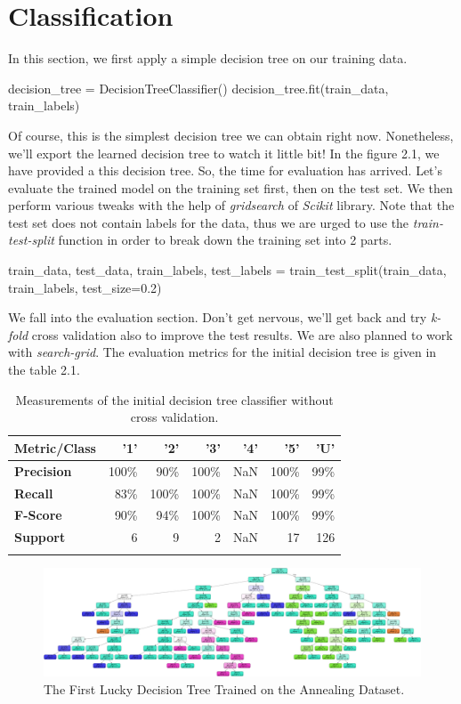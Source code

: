 \documentclass[12pt]{article}
\numberwithin{equation}{section}
\numberwithin{table}{section}
\numberwithin{figure}{section}
\begin{document}
\section{Classification}
In this section, we first apply a simple decision tree on our training data.
\begin{python}
	decision_tree = DecisionTreeClassifier()
	decision_tree.fit(train_data, train_labels)
\end{python}
Of course, this is the simplest decision tree we can obtain right now. Nonetheless, we'll export the learned decision tree to watch it little bit! In the figure 2.1, we have provided a this decision tree. So, the time for evaluation has arrived. Let's evaluate the trained model on the training set first, then on the test set. We then perform various tweaks with the help of \textit{gridsearch} of \textit{Scikit} library. Note that the test set does not contain labels for the data, thus we are urged to use the \textit{train-test-split} function in order to break down the training set into 2 parts.
\begin{python}
	train_data, test_data, train_labels, test_labels =
	train_test_split(train_data, train_labels, test_size=0.2)
\end{python}
We fall into the evaluation section. Don't get nervous, we'll get back and try \textit{k-fold} cross validation also to improve the test results. We are also planned to work with \textit{search-grid}. The evaluation metrics for the initial decision tree is given in the table 2.1.\newpage
\begin{table}[!h] \centering
	\begin{small}
		\begin{tabular}{@{}lrrrrrr@{}}\toprule
			\textbf{Metric/Class} & \textbf{'1'} & \textbf{'2'} & \textbf{'3'} & \textbf{'4'} & \textbf{'5'} & \textbf{'U'}\\ \midrule
			\textbf{Precision} & 100\% & 90\% & 100\% & NaN & 100\% & 99\%\\ \hdashline
			\textbf{Recall} & 83\% & 100\% & 100\% & NaN & 100\% & 99\%\\ \hdashline
			\textbf{F-Score} & 90\% & 94\% & 100\% & NaN & 100\% & 99\%\\ \hdashline
			\textbf{Support} & 6 & 9 & 2 & NaN & 17 & 126\\ \hdashline
			\bottomrule
		\end{tabular}
	\end{small}
	\caption{Measurements of the initial decision tree classifier without cross validation.}
\end{table}

\begin{figure}
	\includegraphics[width=\textwidth]{dt1.png}
	\caption{The First Lucky Decision Tree Trained on the Annealing Dataset.}
	\label{fig:PropProf}
\end{figure}
\end{document}
